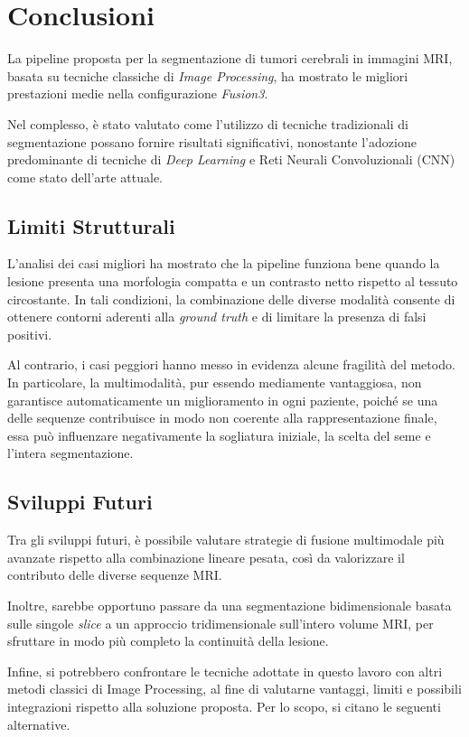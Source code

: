 \chapter{Conclusioni}
La pipeline proposta per la segmentazione di tumori cerebrali in immagini MRI, basata su tecniche classiche di \textit{Image Processing}, ha mostrato le migliori prestazioni medie nella configurazione \textit{Fusion3}.

Nel complesso, è stato valutato come l'utilizzo di tecniche tradizionali di segmentazione possano fornire risultati significativi, nonostante l'adozione predominante di tecniche di \textit{Deep Learning} e Reti Neurali Convoluzionali (CNN) come stato dell'arte attuale.

\section{Limiti Strutturali}
L’analisi dei casi migliori ha mostrato che la pipeline funziona bene quando la lesione presenta una morfologia compatta e un contrasto netto rispetto al tessuto circostante. In tali condizioni, la combinazione delle diverse modalità consente di ottenere contorni aderenti alla \textit{ground truth} e di limitare la presenza di falsi positivi.

Al contrario, i casi peggiori hanno messo in evidenza alcune fragilità del metodo. In particolare, la multimodalità, pur essendo mediamente vantaggiosa, non garantisce automaticamente un miglioramento in ogni paziente, poiché se una delle sequenze contribuisce in modo non coerente alla rappresentazione finale, essa può influenzare negativamente la sogliatura iniziale, la scelta del seme e l’intera segmentazione.

\section{Sviluppi Futuri}
Tra gli sviluppi futuri, è possibile valutare strategie di fusione multimodale più avanzate rispetto alla combinazione lineare pesata, così da valorizzare il contributo delle diverse sequenze MRI.

Inoltre, sarebbe opportuno passare da una segmentazione bidimensionale basata sulle singole \textit{slice} a un approccio tridimensionale sull’intero volume MRI, per sfruttare in modo più completo la continuità della lesione.

Infine, si potrebbero confrontare le tecniche adottate in questo lavoro con altri metodi classici di Image Processing, al fine di valutarne vantaggi, limiti e possibili integrazioni rispetto alla soluzione proposta. Per lo scopo, si citano le seguenti alternative.

